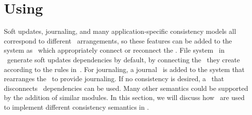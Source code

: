 \section{Using \ChDescs}
\label{sec:using}

Soft updates, journaling, and many application-specific consistency models all
correspond to different \chdesc\ arrangements, so these features can be added to
the system as \modules\ which appropriately connect or reconnect the \chdescs.
%
File system \modules\ in \Kudos\ generate soft updates dependencies by default,
by connecting the \chdescs\ they create according to the rules
in~\cite{ganger00soft}.
%
For journaling, a journal \module\ is added to the system that rearranges the
\chdescs\ to provide journaling.
%
If no consistency is desired, a \module\ that disconnects \chdesc\ dependencies
can be used.
%
Many other semantics could be supported by the addition of similar modules. In
this section, we will discuss how \chdescs\ are used to implement different
consistency semantics in \Kudos.








